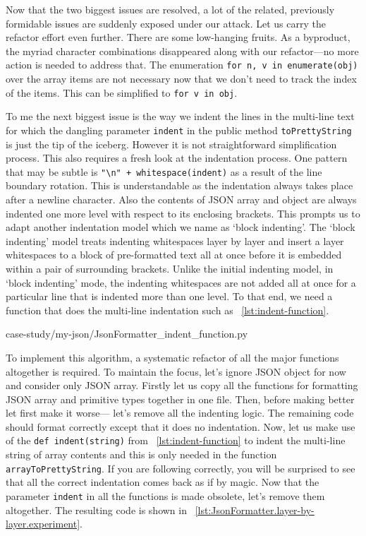 \documentclass[oneside,11pt]{book}
\theoremstyle{definition}
\theoremstyle{remark}
\newcommand{\code}[1]{\mbox{\lstinline{#1}}}
\begin{document}
Now that the two biggest issues are resolved, a lot of the related,
previously formidable issues are suddenly exposed under our attack.
Let us carry the refactor effort even further.
There are some low-hanging fruits.
As a byproduct, the myriad character combinations disappeared along with our
refactor---no more action is needed to address that.
The enumeration \code{for n, v in enumerate(obj)}
over the array items are not necessary now that we don't need to track the
index of the items.
This can be simplified to \code{for v in obj}.

To me the next biggest issue is the way we indent the lines in the multi-line text
for which the dangling parameter \code{indent} in the public method \code{toPrettyString}
is just the tip of the iceberg.
However it is not straightforward simplification process.
This also requires a fresh look at the indentation process.
One pattern that may be subtle is \code{"\n" + whitespace(indent)} as a result of the line
boundary rotation.
This is understandable as the indentation always takes place after a newline character.
Also the contents of JSON array and object are always indented one more level with respect to its
enclosing brackets.
This prompts us to adapt another indentation model which we name as `block indenting'.
The `block indenting' model treats indenting whitespaces layer by layer and
insert a layer whitespaces to a block of pre-formatted text all at once before it is embedded
within a pair of surrounding brackets.
Unlike the initial indenting model, in `block indenting' mode,
the indenting whitespaces are not added all at once for
a particular line that is indented more than one level.
To that end, we need a function that does the multi-line indentation
such as ~\autoref{lst:indent-function}.


{case-study/my-json/JsonFormatter_indent_function.py}

To implement this algorithm, a systematic refactor of all the major functions altogether
is required.
To maintain the focus, let's ignore JSON object for now and consider only JSON array.
Firstly let us copy all the functions for formatting JSON array and primitive types together in
one file.
Then, before making better let first make it worse---
let's remove all the indenting logic.
The remaining code should format correctly except that it does no indentation.
Now, let us make use of the \code{def indent(string)} from
~\autoref{lst:indent-function} to indent the multi-line string of array contents and
this is only needed in the function \code{arrayToPrettyString}.
If you are following correctly, you will be surprised to see that all the correct indentation comes
back as if by magic.
Now that the parameter \code{indent} in all the functions is made obsolete, let's remove them
altogether.
The resulting code is shown in ~\autoref{lst:JsonFormatter.layer-by-layer.experiment}.
\end{document}
